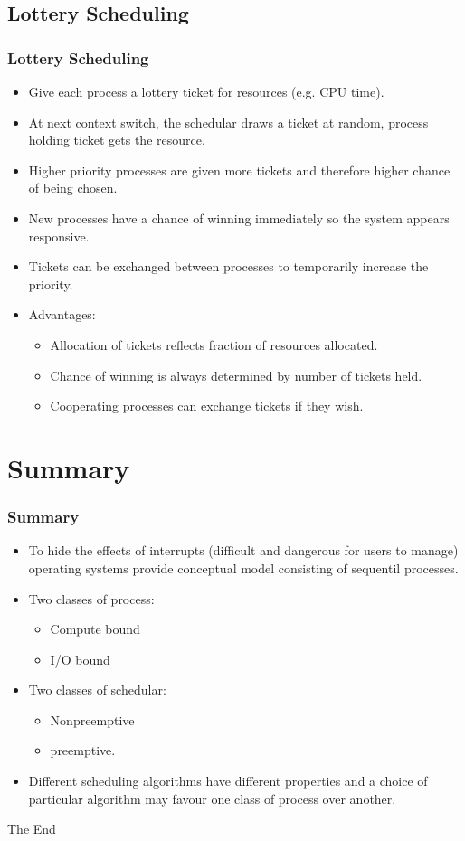 \documentclass{beamer}
\begin{document}
\subsection{Lottery Scheduling}
\begin{frame}
\frametitle{Lottery Scheduling}
\begin{itemize}
\item Give each process a lottery ticket for resources (e.g. CPU time).
\item At next context switch, the schedular draws a ticket at random, process holding ticket gets the resource.
\item Higher priority processes are given more tickets and therefore higher chance of being chosen.
\item New processes have a chance of winning immediately so the system appears responsive.
\item Tickets can be exchanged between processes to temporarily increase the priority.
\item Advantages:
\begin{itemize}
\item Allocation of tickets reflects fraction of resources allocated.
\item Chance of winning is always determined by number of tickets held.
\item Cooperating processes can exchange tickets if they wish.
\end{itemize}
\end{itemize}
\end{frame}
\section{Summary}
\begin{frame}
\frametitle{Summary}
\begin{itemize}
\item To hide the effects of interrupts (difficult and dangerous for users to manage) operating systems provide  conceptual model consisting of sequentil processes.
\item Two classes of process:
\begin{itemize}
\item Compute bound
\item I/O bound
\end{itemize}
\item Two classes of schedular:
\begin{itemize}
\item Nonpreemptive
\item preemptive.
\end{itemize}
\item Different scheduling algorithms have different properties and a choice of particular algorithm may favour one class of process over another.
\end{itemize}
\end{frame}

\begin{frame} 
\Huge{\centerline{The End}}
\end{frame}
\end{document}
